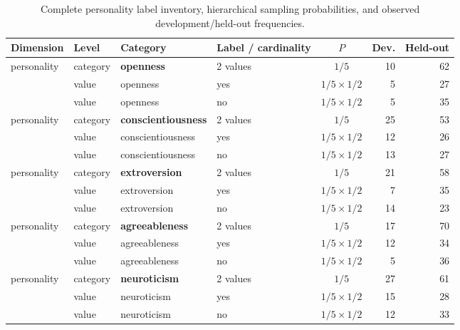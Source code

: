 \documentclass{ieeeaccess}
\begin{document}
\renewcommand{\thetable}{S2b}
\begin{table}[H]
\centering
\footnotesize
\renewcommand{\arraystretch}{0.92}
\caption{Complete personality label inventory, hierarchical sampling probabilities, and observed development/held-out frequencies.}
\label{tab:persona-schema-personality}
\begin{tabularx}{\textwidth}{l l l X c r r}
\toprule
Dimension & Level & Category & Label / cardinality & $P$ & Dev. & Held-out \\
\midrule
personality & category & \textbf{openness} & 2 values & $1/5$ & 10 & 62 \\
 & value & openness & yes & $1/5\times1/2$ & 5 & 27 \\
 & value & openness & no & $1/5\times1/2$ & 5 & 35 \\
personality & category & \textbf{conscientiousness} & 2 values & $1/5$ & 25 & 53 \\
 & value & conscientiousness & yes & $1/5\times1/2$ & 12 & 26 \\
 & value & conscientiousness & no & $1/5\times1/2$ & 13 & 27 \\
personality & category & \textbf{extroversion} & 2 values & $1/5$ & 21 & 58 \\
 & value & extroversion & yes & $1/5\times1/2$ & 7 & 35 \\
 & value & extroversion & no & $1/5\times1/2$ & 14 & 23 \\
personality & category & \textbf{agreeableness} & 2 values & $1/5$ & 17 & 70 \\
 & value & agreeableness & yes & $1/5\times1/2$ & 12 & 34 \\
 & value & agreeableness & no & $1/5\times1/2$ & 5 & 36 \\
personality & category & \textbf{neuroticism} & 2 values & $1/5$ & 27 & 61 \\
 & value & neuroticism & yes & $1/5\times1/2$ & 15 & 28 \\
 & value & neuroticism & no & $1/5\times1/2$ & 12 & 33 \\
\bottomrule
\end{tabularx}
\end{table}
\end{document}

